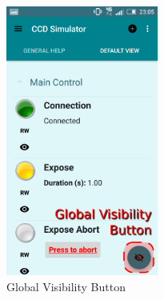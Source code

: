 \begin{figure}
 \centering
 \includegraphics[width=5cm]{../images/globalVisibility.png}
 \caption{Global Visibility Button}
 \label{fig:globalVisibility}
\end{figure}

